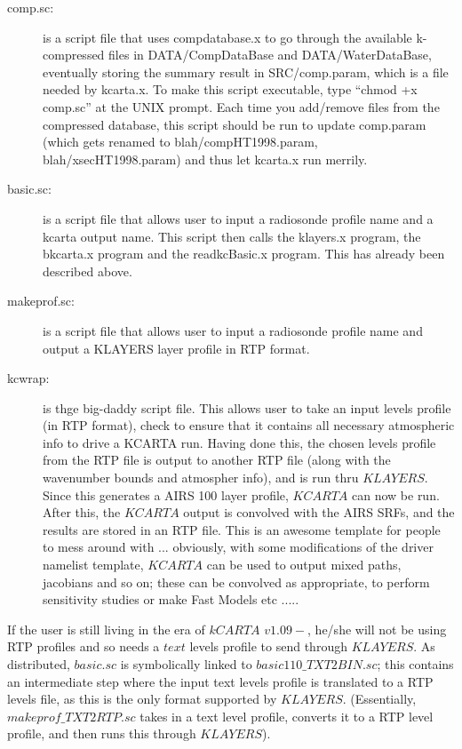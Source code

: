 \documentclass[11pt]{article}
\begin{document}
\begin{description}

\item[comp.sc:] is a script file that uses compdatabase.x to go
  through the available k-compressed files in DATA/CompDataBase and
  DATA/WaterDataBase, eventually storing the summary result in
  SRC/comp.param, which is a file needed by kcarta.x.  To make this
  script executable, type ``chmod +x comp.sc'' at the UNIX prompt.
  Each time you add/remove files from the compressed database, this
  script should be run to update comp.param (which gets renamed to 
  blah/compHT1998.param, blah/xsecHT1998.param) and thus let 
  kcarta.x run merrily.

\item[basic.sc:] is a script file that allows user to input a radiosonde
  profile name and a kcarta output name. This script then calls the 
  klayers.x program, the bkcarta.x program and the readkcBasic.x program. 
  This has already been described above.

\item[makeprof.sc:] is a script file that allows user to input a radiosonde
  profile name and output a KLAYERS layer profile in  RTP format.

\item[kcwrap:] is thge big-daddy script file. This allows user to take an 
  input levels profile (in RTP format), check to ensure that it contains all
  necessary atmospheric info to drive a KCARTA run. Having done this, the
  chosen levels profile from the RTP file is output to another RTP file (along
  with the wavenumber bounds and atmospher info), and is run thru $KLAYERS$.
  Since this generates a AIRS 100 layer profile, $KCARTA$ can now be run.
  After this, the $KCARTA$ output is convolved with the AIRS SRFs, and the
  results are stored in an RTP file. This is an awesome template for people
  to mess around with ... obviously, with some modifications of the driver
  namelist template, $KCARTA$ can be used to output mixed paths, jacobians 
  and so on; these can be convolved as appropriate, to perform sensitivity
  studies or make Fast Models etc .....

\end{description}

If the user is still living in the era of $kCARTA$ $v1.09-$, he/she will not 
be using RTP profiles and so needs a $text$ levels profile to send through 
$KLAYERS$. As distributed, $basic.sc$ is symbolically linked to 
$basic110\_TXT2BIN.sc$; this contains an intermediate step where the input
text levels profile is translated to a RTP levels file, as this is the only
format supported by $KLAYERS$. (Essentially, $makeprof\_TXT2RTP.sc$ takes in
a text level profile, converts it to a RTP level profile, and then runs this
through $KLAYERS$).
\end{document}
